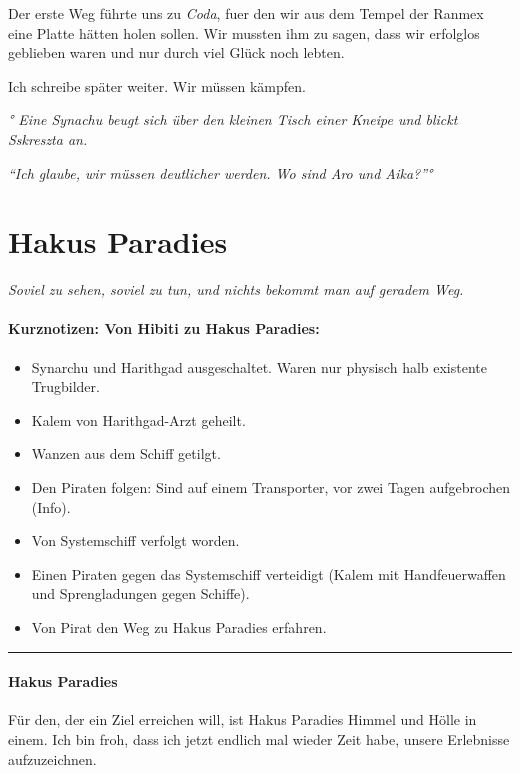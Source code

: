 \documentclass[11pt]{scrartcl}
\begin{document}
Der erste Weg führte uns zu \emph{Coda}, fuer den wir aus dem Tempel der
Ranmex eine Platte hätten holen sollen. Wir mussten ihm zu sagen, dass
wir erfolglos geblieben waren und nur durch viel Glück noch lebten.

Ich schreibe später weiter. Wir müssen kämpfen.

\emph{° Eine Synachu beugt sich über den kleinen Tisch einer Kneipe und
blickt Sskreszta an.}

\emph{``Ich glaube, wir müssen deutlicher werden. Wo sind Aro und
Aika?''°}

\section{Hakus Paradies}

\emph{Soviel zu sehen, soviel zu tun, und nichts bekommt man auf geradem
Weg.}

\paragraph{Kurznotizen: Von Hibiti zu Hakus Paradies:}

\begin{itemize}
\item
  Synarchu und Harithgad ausgeschaltet. Waren nur physisch halb
  existente Trugbilder.
\item
  Kalem von Harithgad-Arzt geheilt.
\item
  Wanzen aus dem Schiff getilgt.
\item
  Den Piraten folgen: Sind auf einem Transporter, vor zwei Tagen
  aufgebrochen (Info).
\item
  Von Systemschiff verfolgt worden.
\item
  Einen Piraten gegen das Systemschiff verteidigt (Kalem mit
  Handfeuerwaffen und Sprengladungen gegen Schiffe).
\item
  Von Pirat den Weg zu Hakus Paradies erfahren.
\end{itemize}
\begin{center}\rule{3in}{0.4pt}\end{center}

\paragraph{Hakus Paradies}

Für den, der ein Ziel erreichen will, ist Hakus Paradies Himmel und
Hölle in einem. Ich bin froh, dass ich jetzt endlich mal wieder Zeit
habe, unsere Erlebnisse aufzuzeichnen.
\end{document}
